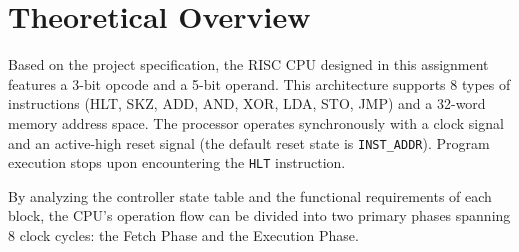 \section{Theoretical Overview}\label{sec:theoretical_overview} %
Based on the project specification, the RISC CPU designed in this assignment features a 3-bit opcode and a 5-bit operand. This architecture supports 8 types of instructions (HLT, SKZ, ADD, AND, XOR, LDA, STO, JMP) and a 32-word memory address space. The processor operates synchronously with a clock signal and an active-high reset signal (the default reset state is \texttt{INST\_ADDR}). Program execution stops upon encountering the \texttt{HLT} instruction.

By analyzing the controller state table and the functional requirements of each block, the CPU's operation flow can be divided into two primary phases spanning 8 clock cycles: the Fetch Phase and the Execution Phase.

